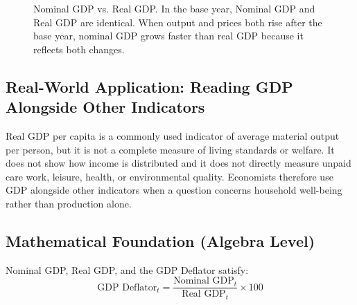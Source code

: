 \documentclass[11pt,letterpaper]{article}
\begin{document}
\begin{figure}[htbp]
\centering
{}
\caption{Nominal GDP vs. Real GDP. In the base year, Nominal GDP and Real GDP are identical. When output and prices both rise after the base year, nominal GDP grows faster than real GDP because it reflects both changes.}
\label{fig:nominal_vs_real_gdp}
\end{figure}

\subsection*{Real-World Application: Reading GDP Alongside Other Indicators}
Real GDP per capita is a commonly used indicator of average material output per person, but it is not a complete measure of living standards or welfare. It does not show how income is distributed and it does not directly measure unpaid care work, leisure, health, or environmental quality. Economists therefore use GDP alongside other indicators when a question concerns household well-being rather than production alone.

\subsection*{Mathematical Foundation (Algebra Level)}
Nominal GDP, Real GDP, and the GDP Deflator satisfy:
\begin{equation}
\text{GDP Deflator}_t = \frac{\text{Nominal GDP}_t}{\text{Real GDP}_t} \times 100
\end{equation}
\end{document}
